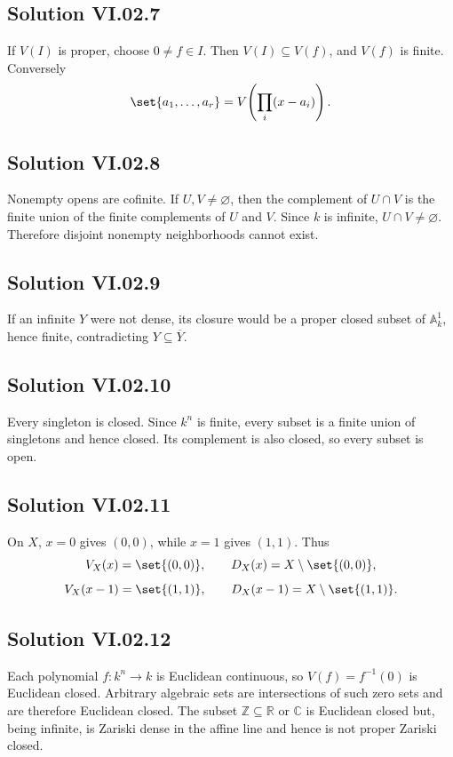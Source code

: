 \subsection*{Solution VI.02.7}
If \(V(I)\) is proper, choose \(0\neq f\in I\).  Then \(V(I)\subseteq V(f)\), and \(V(f)\)
is finite.  Conversely
\[
\set{a_1,\dots,a_r}=V\!\left(\prod_i(x-a_i)\right).
\]

\subsection*{Solution VI.02.8}
Nonempty opens are cofinite.  If \(U,V\neq\varnothing\), then the complement of \(U\cap V\)
is the finite union of the finite complements of \(U\) and \(V\).  Since \(k\) is infinite,
\(U\cap V\neq\varnothing\).  Therefore disjoint nonempty neighborhoods cannot exist.

\subsection*{Solution VI.02.9}
If an infinite \(Y\) were not dense, its closure would be a proper closed subset of
\(\mathbb A_k^1\), hence finite, contradicting \(Y\subseteq\overline Y\).

\subsection*{Solution VI.02.10}
Every singleton is closed.  Since \(k^n\) is finite, every subset is a finite union of
singletons and hence closed.  Its complement is also closed, so every subset is open.

\subsection*{Solution VI.02.11}
On \(X\), \(x=0\) gives \((0,0)\), while \(x=1\) gives \((1,1)\).  Thus
\[
V_X(x)=\set{(0,0)},\qquad D_X(x)=X\setminus\set{(0,0)},
\]
\[
V_X(x-1)=\set{(1,1)},\qquad D_X(x-1)=X\setminus\set{(1,1)}.
\]

\subsection*{Solution VI.02.12}
Each polynomial \(f:k^n\to k\) is Euclidean continuous, so \(V(f)=f^{-1}(0)\) is Euclidean
closed.  Arbitrary algebraic sets are intersections of such zero sets and are therefore
Euclidean closed.  The subset \(\mathbb Z\subseteq\mathbb R\) or \(\mathbb C\) is Euclidean
closed but, being infinite, is Zariski dense in the affine line and hence is not proper
Zariski closed.

